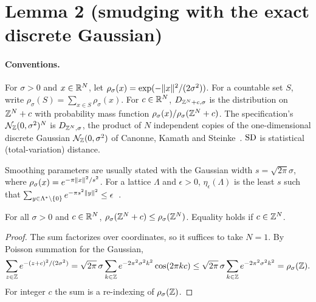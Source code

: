 \section{Lemma 2 (smudging with the exact discrete Gaussian)}
\label{sec:smudge}

\paragraph{Conventions.}
For $\sigma>0$ and $x\in\mathbb{R}^N$, let $\rho_\sigma(x)=\exp(-\lVert x\rVert^2/(2\sigma^2))$. For a countable set $S$, write $\rho_\sigma(S)=\sum_{x\in S}\rho_\sigma(x)$. For $c\in\mathbb{R}^N$, $D_{\mathbb{Z}^N+c,\sigma}$ is the distribution on $\mathbb{Z}^N+c$ with probability mass function $\rho_\sigma(x)/\rho_\sigma(\mathbb{Z}^N+c)$. The specification's $\mathcal{N}_{\mathbb{Z}}(0,\sigma^2)^N$ is $D_{\mathbb{Z}^N,\sigma}$, the product of $N$ independent copies of the one-dimensional discrete Gaussian $\mathcal{N}_{\mathbb{Z}}(0,\sigma^2)$ of Canonne, Kamath and Steinke~\cite{CKS20}. $\mathrm{SD}$ is statistical (total-variation) distance.

Smoothing parameters are usually stated with the Gaussian width $s=\sqrt{2\pi}\sigma$, where $\rho_\sigma(x)=e^{-\pi\lVert x\rVert^2/s^2}$. For a lattice $\Lambda$ and $\epsilon>0$, $\eta_\epsilon(\Lambda)$ is the least $s$ such that $\sum_{y\in\Lambda^*\setminus\{0\}}e^{-\pi s^2\lVert y\rVert^2}\le\epsilon$~\cite{MR07}.

\begin{lemma}\label{lem:gsum}
For all $\sigma>0$ and $c\in\mathbb{R}^N$, $\rho_\sigma(\mathbb{Z}^N+c)\le\rho_\sigma(\mathbb{Z}^N)$. Equality holds if $c\in\mathbb{Z}^N$.
\end{lemma}
\begin{proof}
The sum factorizes over coordinates, so it suffices to take $N=1$. By Poisson summation for the Gaussian,
\[
  \sum_{z\in\mathbb{Z}}e^{-(z+c)^2/(2\sigma^2)}=\sqrt{2\pi}\,\sigma\sum_{k\in\mathbb{Z}}e^{-2\pi^2\sigma^2k^2}\cos(2\pi kc)\le\sqrt{2\pi}\,\sigma\sum_{k\in\mathbb{Z}}e^{-2\pi^2\sigma^2k^2}=\rho_\sigma(\mathbb{Z}).
\]
For integer $c$ the sum is a re-indexing of $\rho_\sigma(\mathbb{Z})$.
\end{proof}

